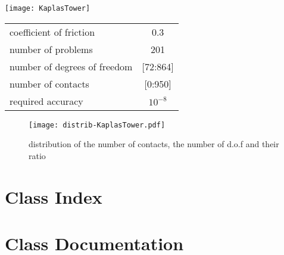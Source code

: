 \documentclass[twoside]{article}
\begin{document}
  \begin{minipage}{0.50\linewidth}
    \texttt{[image: KaplasTower]}
  \end{minipage}
  \begin{minipage}{0.49\linewidth}
    \begin{tabular}{|p{}|c|}
      coefficient of friction &  0.3\\[\ssep]
      number of problems &  201 \\[\ssep]
      number of degrees of freedom & [72:864] \\[\ssep]
      number of contacts &  [0:950]\\[\ssep]
      required accuracy   & $10^{-8}$
    \end{tabular}
  \end{minipage}


\begin{figure}[htbp]
  \centering
  \texttt{[image: distrib-KaplasTower.pdf]}
  \caption{distribution of the number of contacts, the number of d.o.f and their ratio}
  \label{fig:KaplasTower-distrib}
\end{figure}



\clearpage


\clearpage
\appendix
% 
% 
% 
\section{Class Index}

% 
\section{Class Documentation}










\end{document}
